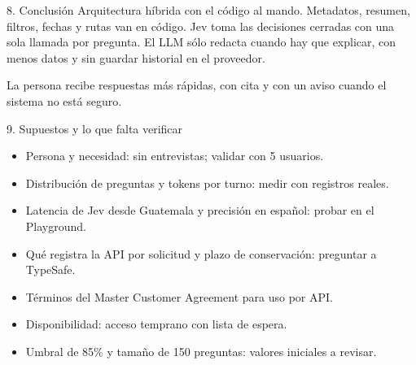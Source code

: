 \documentclass{article}
\begin{document}
\begin{minipage}[t]{0.25\linewidth}\vspace{0pt}
\begin{panel}[equal height group=f4]{8. Conclusión}
  Arquitectura híbrida con el código al mando. Metadatos, resumen, filtros, fechas y rutas van en código. Jev toma las decisiones cerradas con una sola llamada por pregunta. El LLM sólo redacta cuando hay que explicar, con menos datos y sin guardar historial en el proveedor.

  La persona recibe respuestas más rápidas, con cita y con un aviso cuando el sistema no está seguro.
\end{panel}
\end{minipage}\hfill
\begin{minipage}[t]{0.35\linewidth}\vspace{0pt}
\begin{panel}[colback=supf,colframe=sup!50,equal height group=f4]{9. Supuestos y lo que falta verificar}
  \begin{itemize}
    \item Persona y necesidad: sin entrevistas; validar con 5 usuarios.
    \item Distribución de preguntas y tokens por turno: medir con registros reales.
    \item Latencia de Jev desde Guatemala y precisión en español: probar en el Playground.
    \item Qué registra la API por solicitud y plazo de conservación: preguntar a TypeSafe.
    \item Términos del Master Customer Agreement para uso por API.
    \item Disponibilidad: acceso temprano con lista de espera.
    \item Umbral de 85\% y tamaño de 150 preguntas: valores iniciales a revisar.
  \end{itemize}
\end{panel}
\end{minipage}\hfill
\end{document}
